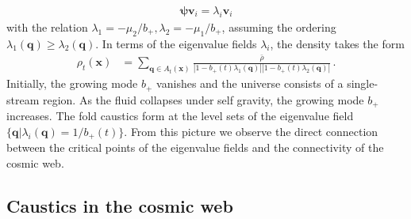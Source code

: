 \documentclass[a4paper, 11pt]{article}
\begin{document}
\begin{align}
\bm{\psi}\bm{v}_i = \lambda_i \bm{v}_i
\end{align}
with the relation $\lambda_1 =-\mu_2/b_+,\lambda_2 =-\mu_1/b_+$, assuming the ordering $\lambda_1(\bm{q}) \geq \lambda_2(\bm{q})$. In terms of the eigenvalue fields $\lambda_i$, the density takes the form 
\begin{align}
\rho_t(\bm{x})
&= \sum_{\bm{q} \in A_t(\bm{x})} \frac{\bar{\rho}}{|1-b_+(t) \lambda_1(\bm{q})||1-b_+(t) \lambda_2(\bm{q})|}\,.
\end{align}
Initially, the growing mode $b_+$ vanishes and the universe consists of a single-stream region. As the fluid collapses under self gravity, the growing mode $b_+$ increases. The fold caustics form at the level sets of the eigenvalue field $\{\bm{q}|\lambda_i(\bm{q})=1/b_+(t)\}$. From this picture we observe the direct connection between the critical points of the eigenvalue fields and the connectivity of the cosmic web.


\subsection{Caustics in the cosmic web}
\end{document}
